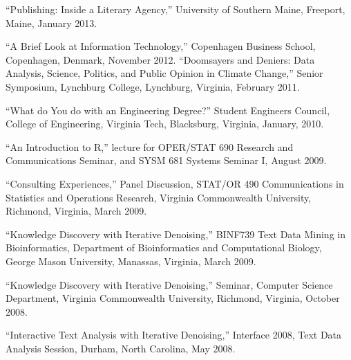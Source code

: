 \documentclass[11pt,article,oneside]{memoir}
\begin{document}






 
 \bigskip

\medskip

\ind “Publishing: Inside a Literary Agency,” University of Southern Maine, Freeport, Maine, January 2013.

\ind “A Brief Look at Information Technology,” Copenhagen Business School, Copenhagen, Denmark, November 2012.
“Doomsayers and Deniers: Data Analysis, Science, Politics, and Public Opinion in Climate Change,” Senior Symposium, Lynchburg College, Lynchburg, Virginia, February 2011.

\ind “What do You do with an Engineering Degree?” Student Engineers Council, College of Engineering, Virginia Tech, Blacksburg, Virginia, January, 2010.

\ind “An Introduction to R,” lecture for OPER/STAT 690 Research and Communications Seminar, and SYSM 681 Systems Seminar I, August 2009.

\ind “Consulting Experiences,” Panel Discussion, STAT/OR 490 Communications in Statistics and Operations Research, Virginia Commonwealth University, Richmond, Virginia, March 2009.

\ind “Knowledge Discovery with Iterative Denoising,” BINF739 Text Data Mining in Bioinformatics, Department of Bioinformatics and Computational Biology, George Mason University, Manassas, Virginia, March 2009.

\ind “Knowledge Discovery with Iterative Denoising,” Seminar, Computer Science Department, Virginia Commonwealth University, Richmond, Virginia, October 2008.

\ind “Interactive Text Analysis with Iterative Denoising,” Interface 2008, Text Data Analysis Session, Durham, North Carolina, May 2008.
\end{document}
